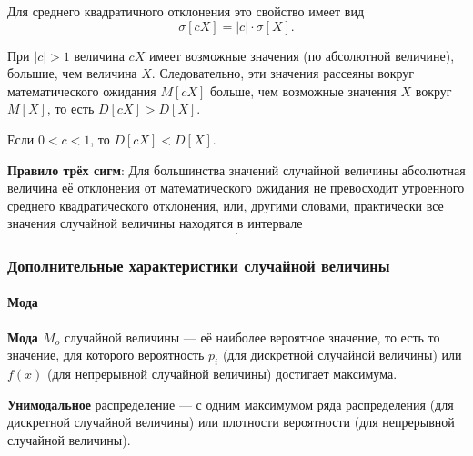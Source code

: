 \documentclass[a4paper]{article}
\newcommand{\key}[1]{{\color{Medium}\bfseries #1}}
\begin{document}
\begin{enumerated}
                        Для среднего квадратичного отклонения это свойство имеет вид
                        \begin{equation*}
                            \sigma [c X] = |c| \cdot \sigma [X] .
                        \end{equation*}
                    \end{enumerated}

                    При $|c| > 1$ величина $c X$ имеет возможные значения (по абсолютной величине), большие, чем величина $X$. Следовательно, эти значения рассеяны вокруг математического ожидания $M[c X]$ больше, чем возможные значения $X$ вокруг $M[X]$, то есть $D[c X] > D[X]$.
                    
                    Если $0 < c < 1$, то $D[c X] < D[X]$.

                    \key{Правило трёх сигм}: \newline
                    Для большинства значений случайной величины абсолютная величина её отклонения от математического ожидания не превосходит утроенного среднего квадратического отклонения, или, другими словами, практически все значения случайной величины находятся в интервале
                    \begin{equation*}
                        [m - 3 \sigma ; \: m + 3 \sigma] .
                    \end{equation*}

            \subsubsection{Дополнительные характеристики случайной величины}

                \paragraph{Мода}
            
                    \key{Мода \boldmath$M_o$} случайной величины --- её наиболее вероятное значение, то есть то значение, для которого вероятность $p_i$ (для дискретной случайной величины) или $f(x)$ (для непрерывной случайной величины) достигает максимума.

                    \key{Унимодальное} распределение --- с одним максимумом ряда распределения (для дискретной случайной величины) или плотности вероятности (для непрерывной случайной величины).
                        
\end{document}
